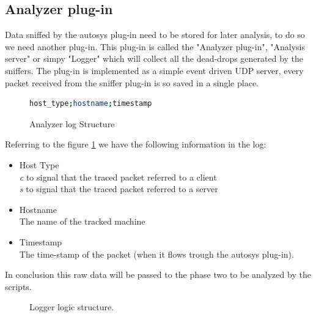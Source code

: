 \subsection{Analyzer plug-in}
Data sniffed by the autosys plug-in need to be stored for later analysis, 
to do so we need another plug-in.
This plug-in is called the "Analyzer plug-in", "Analysis server" or simpy "Logger"
which will collect all the dead-drops generated by the sniffers.
The plug-in is implemented as a simple event driven UDP server, every
packet received from the sniffer plug-in is so saved in a single place.
\begin{figure}[H]
\begin{lstlisting}[language=bash,frame=single]
host_type;hostname;timestamp
\end{lstlisting}
\caption{Analyzer log Structure}
\label{fig:analyzer_pack_struct}
\end{figure}
Referring to the figure \ref{fig:analyzer_pack_struct} we have the following
information in the log:
\begin{itemize}
\item Host Type \hfill \\
\emph{c} to signal that the traced packet referred to a client\\
\emph{s} to signal that the traced packet referred to a server
\item Hostname \hfill \\
The name of the tracked machine
\item Timestamp \hfill \\
The time-stamp of the packet (when it flows trough the autosys plug-in).
\end{itemize}

In conclusion this raw data will be passed to the phase two to be analyzed by the scripts.\\
\begin{figure}[H]
\centering
{}
\caption {Logger logic structure.}
\label{fig:autosys_diagram}
\end{figure}

